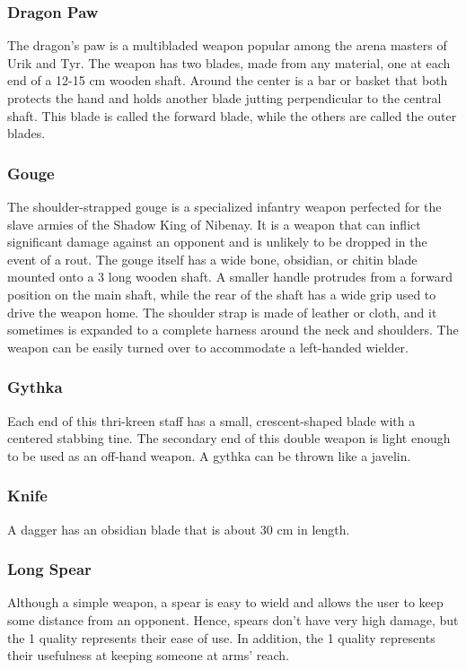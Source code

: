 \begin{multicols}{2}
\subsubsection{Dragon Paw}
\label{itmmlee:dragonpaw}
The dragon's paw is a multibladed weapon
popular among the arena masters of
Urik and Tyr. The weapon has two blades,
made from any material, one at each end
of a 12-15 cm wooden shaft. Around the center
is a bar or basket that both protects the
hand and holds another blade jutting
perpendicular to the central shaft. This
blade is called the forward blade, while
the others are called the outer blades.

\subsubsection{Gouge}
\label{itmmlee:gouge}
The shoulder-strapped gouge is a specialized infantry weapon perfected
for the slave armies of the Shadow King of Nibenay. It is a weapon that
can inflict significant damage against an opponent and is unlikely to be
dropped in the event of a rout. The gouge itself has a wide bone, obsidian,
or chitin blade mounted onto a 3 long wooden shaft. A smaller handle protrudes
from a forward position on the main shaft, while the rear of the shaft has a
wide grip used to drive the weapon home. The shoulder strap is made of leather
or cloth, and it sometimes is expanded to a complete harness around the neck
and shoulders. The weapon can be easily turned over to accommodate a
left-handed wielder.

\subsubsection{Gythka}
\label{itmmlee:gythka}
Each end of this thri-kreen staff has a
small, crescent-shaped blade with a centered stabbing
tine. The secondary end of this double weapon is light
enough to be used as an off-hand weapon. A gythka
can be thrown like a javelin.

\subsubsection{Knife}
\label{itmmlee:knife}
A dagger has an obsidian blade that is about 30 cm in length.

\subsubsection{Long Spear}
\label{itmmlee:longspear}
Although a simple weapon, a spear is easy to wield and
allows the user to keep some distance from an opponent.
Hence, spears don’t have very high damage, but the  1
quality represents their ease of use. In addition, the  1
quality represents their usefulness at keeping someone at arms’ reach.


\end{multicols}
